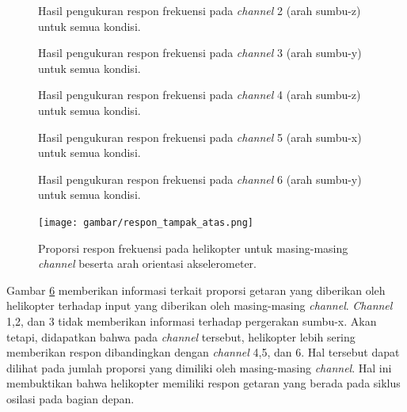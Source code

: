 \begin{figure}[h]
	\centering
	\caption{Hasil pengukuran respon frekuensi pada \textit{channel} 2 (arah sumbu-z) untuk semua kondisi.}
	\label{fig:channel_2}
\end{figure}

\begin{figure}[]
	\centering
	\caption{Hasil pengukuran respon frekuensi pada \textit{channel} 3 (arah sumbu-y) untuk semua kondisi.}
	\label{fig:channel_3}
\end{figure}

\begin{figure}[H]
	\centering
	\caption{Hasil pengukuran respon frekuensi pada \textit{channel} 4 (arah sumbu-z) untuk semua kondisi.}
	\label{fig:channel_4}
\end{figure}

\begin{figure}[h]
	\centering
	\caption{Hasil pengukuran respon frekuensi pada \textit{channel} 5 (arah sumbu-x) untuk semua kondisi.}
	\label{fig:channel_5}
\end{figure}

\begin{figure}[H]
	\centering
	\caption{Hasil pengukuran respon frekuensi pada \textit{channel} 6 (arah sumbu-y) untuk semua kondisi.}
	\label{fig:channel_6}
\end{figure}

\begin{figure}[H]
	\centering
	\texttt{[image: gambar/respon\_tampak\_atas.png]}
	\caption{Proporsi respon frekuensi pada helikopter untuk masing-masing \textit{channel} beserta arah orientasi akselerometer.}
	\label{fig:respon_tampak_atas}
\end{figure}

Gambar \ref{fig:respon_tampak_atas} memberikan informasi terkait proporsi getaran yang diberikan oleh helikopter terhadap input yang diberikan oleh masing-masing \textit{channel}. \textit{Channel} 1,2, dan 3 tidak memberikan informasi terhadap pergerakan sumbu-x. Akan tetapi, didapatkan bahwa pada \textit{channel} tersebut, helikopter lebih sering memberikan respon dibandingkan dengan \textit{channel} 4,5, dan 6. Hal tersebut dapat dilihat pada jumlah proporsi yang dimiliki oleh masing-masing \textit{channel}. Hal ini membuktikan bahwa helikopter memiliki respon getaran yang berada pada siklus osilasi pada bagian depan.

